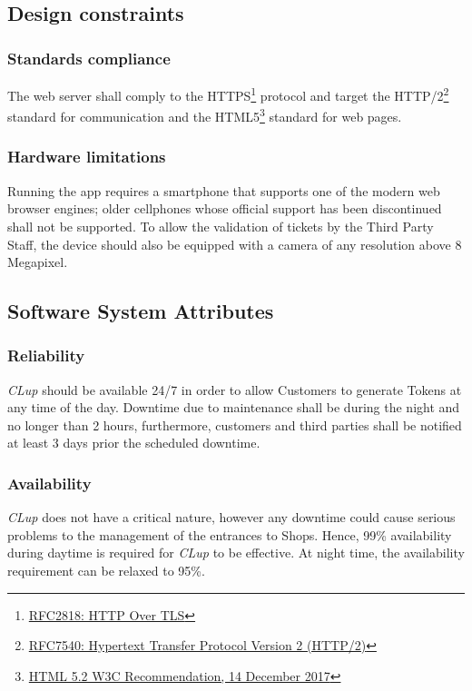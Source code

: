 \subsection{Design constraints}
\subsubsection{Standards compliance}
The web server shall comply to the HTTPS\footnote{\href{https://tools.ietf.org/html/rfc2818}{RFC2818: HTTP Over TLS}} protocol and target the HTTP/2\footnote{\href{https://tools.ietf.org/html/rfc7540}{RFC7540: Hypertext Transfer Protocol Version 2 (HTTP/2)}} standard for communication and the HTML5\footnote{\href{https://www.w3.org/TR/2017/REC-html52-20171214/}{HTML 5.2 W3C Recommendation, 14 December 2017}} standard for web pages.

\subsubsection{Hardware limitations}
Running the app requires a smartphone that supports one of the modern web browser engines; older cellphones whose official support has been discontinued shall not be supported.
To allow the validation of tickets by the Third Party Staff, the device should also be equipped with a camera of any resolution above 8 Megapixel.

\subsection{Software System Attributes}
\subsubsection{Reliability}
\textit{CLup} should be available 24/7 in order to allow Customers to generate Tokens at any time of the day. Downtime due to maintenance shall be during the night and no longer than 2 hours, furthermore, customers and third parties shall be notified at least 3 days prior the scheduled downtime.
\subsubsection{Availability}
\emph{CLup} does not have a critical nature, however any downtime could cause serious problems to the management of the entrances to Shops. Hence, 99\% availability during daytime is required for \emph{CLup} to be effective. At night time, the availability requirement can be relaxed to 95\%.
